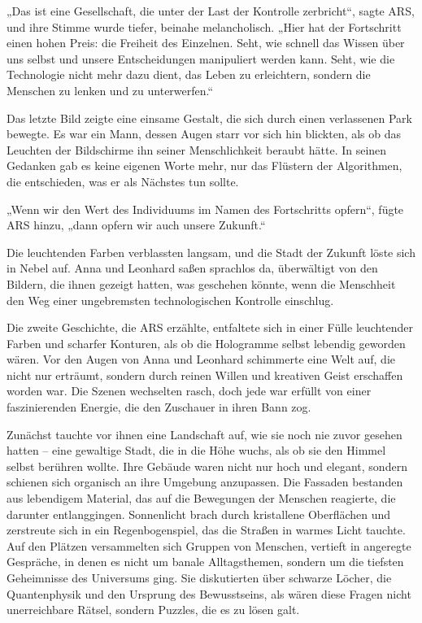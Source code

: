 \documentclass[
]{article}
\begin{document}
„Das ist eine Gesellschaft, die unter der Last der Kontrolle
zerbricht``, sagte ARS, und ihre Stimme wurde tiefer, beinahe
melancholisch. „Hier hat der Fortschritt einen hohen Preis: die Freiheit
des Einzelnen. Seht, wie schnell das Wissen über uns selbst und unsere
Entscheidungen manipuliert werden kann. Seht, wie die Technologie nicht
mehr dazu dient, das Leben zu erleichtern, sondern die Menschen zu
lenken und zu unterwerfen.``

Das letzte Bild zeigte eine einsame Gestalt, die sich durch einen
verlassenen Park bewegte. Es war ein Mann, dessen Augen starr vor sich
hin blickten, als ob das Leuchten der Bildschirme ihn seiner
Menschlichkeit beraubt hätte. In seinen Gedanken gab es keine eigenen
Worte mehr, nur das Flüstern der Algorithmen, die entschieden, was er
als Nächstes tun sollte.

„Wenn wir den Wert des Individuums im Namen des Fortschritts opfern``,
fügte ARS hinzu, „dann opfern wir auch unsere Zukunft.``

Die leuchtenden Farben verblassten langsam, und die Stadt der Zukunft
löste sich in Nebel auf. Anna und Leonhard saßen sprachlos da,
überwältigt von den Bildern, die ihnen gezeigt hatten, was geschehen
könnte, wenn die Menschheit den Weg einer ungebremsten technologischen
Kontrolle einschlug.

Die zweite Geschichte, die ARS erzählte, entfaltete sich in einer Fülle
leuchtender Farben und scharfer Konturen, als ob die Hologramme selbst
lebendig geworden wären. Vor den Augen von Anna und Leonhard schimmerte
eine Welt auf, die nicht nur erträumt, sondern durch reinen Willen und
kreativen Geist erschaffen worden war. Die Szenen wechselten rasch, doch
jede war erfüllt von einer faszinierenden Energie, die den Zuschauer in
ihren Bann zog.

Zunächst tauchte vor ihnen eine Landschaft auf, wie sie noch nie zuvor
gesehen hatten -- eine gewaltige Stadt, die in die Höhe wuchs, als ob
sie den Himmel selbst berühren wollte. Ihre Gebäude waren nicht nur hoch
und elegant, sondern schienen sich organisch an ihre Umgebung
anzupassen. Die Fassaden bestanden aus lebendigem Material, das auf die
Bewegungen der Menschen reagierte, die darunter entlanggingen.
Sonnenlicht brach durch kristallene Oberflächen und zerstreute sich in
ein Regenbogenspiel, das die Straßen in warmes Licht tauchte. Auf den
Plätzen versammelten sich Gruppen von Menschen, vertieft in angeregte
Gespräche, in denen es nicht um banale Alltagsthemen, sondern um die
tiefsten Geheimnisse des Universums ging. Sie diskutierten über schwarze
Löcher, die Quantenphysik und den Ursprung des Bewusstseins, als wären
diese Fragen nicht unerreichbare Rätsel, sondern Puzzles, die es zu
lösen galt.
\end{document}
